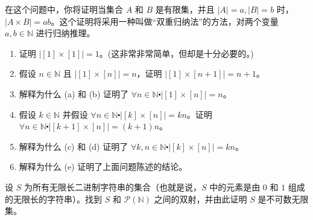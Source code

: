 \begin{exercise}
    在这个问题中，你将证明当集合 $A$ 和 $B$ 是有限集，并且 $|A| = a, |B| = b$ 时，$|A \times B| = ab$。这个证明将采用一种叫做``双重归纳法''的方法，对两个变量 $a,b \in \mathbb{N}$ 进行归纳推理。
    \begin{enumerate}[label=(\alph*)]
        \item 证明 $\big|[1] \times [1]\big| = 1$。(这非常非常简单，但却是十分必要的。)
        \item 假设 $n \in \mathbb{N}$ 且 $\big|[1] \times [n]\big| = n$，证明 $\big|[1] \times [n+1]\big| = n+1$。
        \item 解释为什么 (a) 和 (b) 证明了 $\forall n \in \mathbb{N} \centerdot \big|[1] \times [n]\big| = n$。
        \item 假设 $k \in \mathbb{N}$ 并假设 $\forall n \in \mathbb{N} \centerdot \big|[k] \times [n]\big| = kn$。证明 $\forall n \in \mathbb{N} \centerdot \big|[k+1] \times [n]\big| = (k+1)n$。
        \item 解释为什么 (c) 和 (d) 证明了 $\forall k,n \in \mathbb{N} \centerdot \big|[k] \times [n]\big| = kn$。
        \item 解释为什么 (e) 证明了上面问题陈述的结论。
    \end{enumerate}\label{exc:exercises7.8.32}
\end{exercise}

\begin{exercise}
    设 $S$ 为所有无限长二进制字符串的集合（也就是说，$S$ 中的元素是由 $0$ 和 $1$ 组成的无限长的字符串）。找到 $S$ 和 $\mathcal{P}(\mathbb{N})$ 之间的双射，并由此证明 $S$ 是不可数无限集。\label{exc:exercises7.8.33}
\end{exercise}

